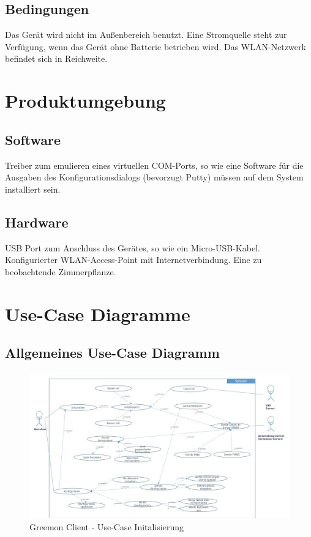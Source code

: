 \documentclass[pointlessnumbers]{scrartcl}
\begin{document}
\subsection{Bedingungen}
    Das Gerät wird nicht im Außenbereich benutzt. Eine Stromquelle steht zur Verfügung, wenn das Gerät ohne Batterie betrieben wird. Das WLAN-Netzwerk befindet sich in Reichweite.
\section{Produktumgebung}
\subsection{Software}
    Treiber zum emulieren eines virtuellen COM-Ports, so wie eine Software für die Ausgaben des Konfigurationsdialogs (bevorzugt Putty) müssen auf dem System installiert sein.
\subsection{Hardware}
    USB Port zum Anschluss des Gerätes, so wie ein Micro-USB-Kabel. Konfigurierter WLAN-Access-Point mit Internetverbindung. Eine zu beobachtende Zimmerpflanze.





\section{Use-Case Diagramme}
\subsection{Allgemeines Use-Case Diagramm}

\begin{figure}[htbp] 
  \centering
     \includegraphics[width=1\textwidth]{images/usecase_client_allgemein.jpg}
  \caption{Greemon Client - Use-Case Initalisierung}
  \label{fig:usecase_client_init}
\end{figure}
\end{document}
